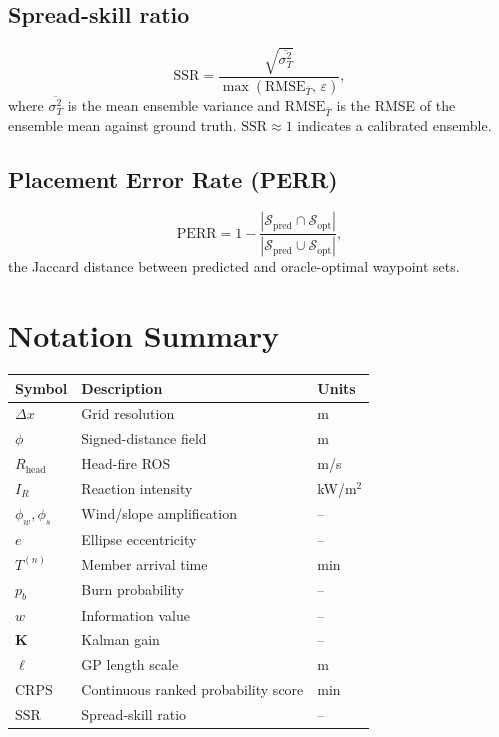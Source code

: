\documentclass[11pt,twocolumn]{article}
\begin{document}
\subsection{Spread-skill ratio}

\begin{equation}
  \mathrm{SSR} = \frac{\sqrt{\overline{\sigma^2_T}}}
                      {\max(\mathrm{RMSE}_{\bar{T}},\,\varepsilon)},
  \label{eq:ssr}
\end{equation}
where $\overline{\sigma^2_T}$ is the mean ensemble variance and
$\mathrm{RMSE}_{\bar{T}}$ is the RMSE of the ensemble mean against
ground truth.  $\mathrm{SSR}\approx1$ indicates a calibrated ensemble.

\subsection{Placement Error Rate (PERR)}

\begin{equation}
  \mathrm{PERR} = 1 -
    \frac{|\mathcal{S}_{\mathrm{pred}}\cap\mathcal{S}_{\mathrm{opt}}|}
         {|\mathcal{S}_{\mathrm{pred}}\cup\mathcal{S}_{\mathrm{opt}}|},
  \label{eq:perr}
\end{equation}
the Jaccard distance between predicted and oracle-optimal waypoint
sets.

\section{Notation Summary}

\begin{table}[h]
\centering\small
\begin{tabular}{@{}lll@{}}
\toprule
Symbol & Description & Units \\
\midrule
$\Delta x$ & Grid resolution & m \\
$\phi$ & Signed-distance field & m \\
$R_{\mathrm{head}}$ & Head-fire ROS & m/s \\
$I_R$ & Reaction intensity & kW/m$^2$ \\
$\phi_w,\phi_s$ & Wind/slope amplification & -- \\
$e$ & Ellipse eccentricity & -- \\
$T^{(n)}$ & Member arrival time & min \\
$p_b$ & Burn probability & -- \\
$w$ & Information value & -- \\
$\mathbf{K}$ & Kalman gain & -- \\
$\ell$ & GP length scale & m \\
$\mathrm{CRPS}$ & Continuous ranked probability score & min \\
$\mathrm{SSR}$ & Spread-skill ratio & -- \\
\bottomrule
\end{tabular}
\end{table}
\end{document}

